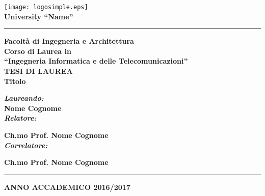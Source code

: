 
\begin{titlepage}
 \begin{center}
     \texttt{[image: logosimple.eps]}\\
     \vspace{1em}
     \Large{ \textbf  {University 
     		 \textquotedblleft Name\textquotedblright}}\\
 \hrule 
\vspace{0.3em}
      \large{ \textbf{Facolt\`{a} di Ingegneria e Architettura}}\\
     \normalsize{\textbf{Corso di Laurea in\\
     \textquotedblleft Ingegneria Informatica e delle Telecomunicazioni\textquotedblright}}\\
    
     \vspace{2.6cm}
     \Large{ \textbf{TESI DI LAUREA}}\\
		\vspace{2em}
     \large{\textbf{Titolo}}\\
 \end{center}

\vskip 1.5cm
  \noindent \small{\textbf{\textit{Laureando:}}}\\
     \noindent \textbf{Nome Cognome}\\
 
   \hspace{225pt} \small{\textbf{\textit{Relatore:}}}
  
   \hspace{225pt} \textbf{Ch.mo Prof. Nome Cognome}\\

   \hspace{225pt} \small{\textbf{\textit{Correlatore:}}}
   
   \hspace{225pt} \textbf{Ch.mo Prof. Nome Cognome}
   
  

\vskip 1.5cm
\begin{center}
\hrule
\vspace{0.2em}
\textbf{ANNO ACCADEMICO 2016/2017}
\end{center}
\end{titlepage}

\clearpage{\pagestyle{empty}\cleardoublepage}


